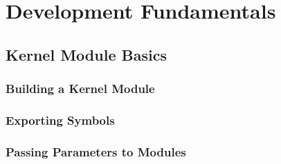 \chapter{Development Fundamentals}

\section{Kernel Module Basics}
\subsection{Building a Kernel Module}
\subsection{Exporting Symbols}
\subsection{Passing Parameters to Modules} 


